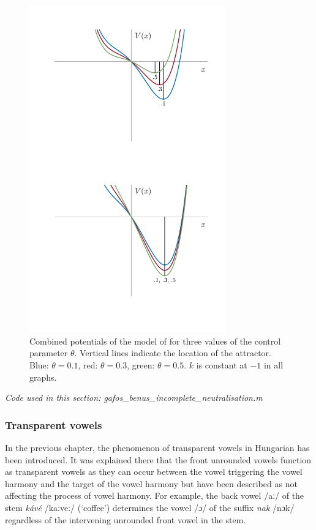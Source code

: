 \begin{figure}[p]
\begin{center}
\includegraphics[width=8.5cm]{figures/ch3/gafos_combined_potentials.pdf}
\caption[Combined potentials of the model of \citet{GafosBenus2006}.]{Combined potentials of the model of \citet{GafosBenus2006} for three values of the control parameter $\theta$. Vertical lines indicate the location of the attractor. Blue: $\theta = 0.1$, red: $\theta = 0.3$, green: $\theta = 0.5$. $k$ is constant at $-1$ in all graphs.}
\label{fig:gafos_benus_combined_potentials}
\end{center}
\end{figure}

\medskip\noindent \textit{Code used in this section: gafos\_benus\_incomplete\_neutralisation.m}

\subsubsection{Transparent vowels}

In the previous chapter, the phenomenon of transparent vowels in Hungarian has been introduced. It was explained there that the front unrounded vowels function as transparent vowels as they can occur between the vowel triggering the vowel harmony and the target of the vowel harmony but have been described as not affecting the process of vowel harmony. For example, the back vowel /aː/ of the stem \emph{kávé} /kaːveː/ (`coffee') determines the vowel /ɔ/ of the suffix \emph{nak} /nɔk/ regardless of the intervening unrounded front vowel in the stem. 

